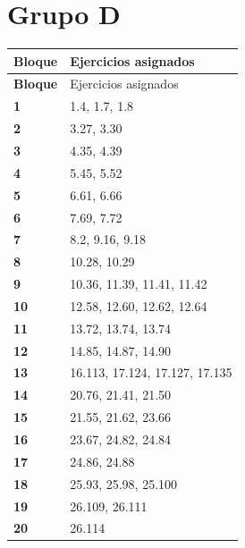 \documentclass[11pt,letterpaper]{article}
\begin{document}
\section*{Grupo D}
\small
\begin{longtable}{>{\bfseries}p{2cm}p{13.5cm}}
\toprule Bloque & Ejercicios asignados \\ \midrule
\endfirsthead
\toprule Bloque & Ejercicios asignados \\ \midrule
\endhead
1 & 1.4, 1.7, 1.8 \\
2 & 3.27, 3.30 \\
3 & 4.35, 4.39 \\
4 & 5.45, 5.52 \\
5 & 6.61, 6.66 \\
6 & 7.69, 7.72 \\
7 & 8.2, 9.16, 9.18 \\
8 & 10.28, 10.29 \\
9 & 10.36, 11.39, 11.41, 11.42 \\
10 & 12.58, 12.60, 12.62, 12.64 \\
11 & 13.72, 13.74, 13.74 \\
12 & 14.85, 14.87, 14.90 \\
13 & 16.113, 17.124, 17.127, 17.135 \\
14 & 20.76, 21.41, 21.50 \\
15 & 21.55, 21.62, 23.66 \\
16 & 23.67, 24.82, 24.84 \\
17 & 24.86, 24.88 \\
18 & 25.93, 25.98, 25.100 \\
19 & 26.109, 26.111 \\
20 & 26.114 \\
\bottomrule
\end{longtable}
\normalsize
\end{document}
